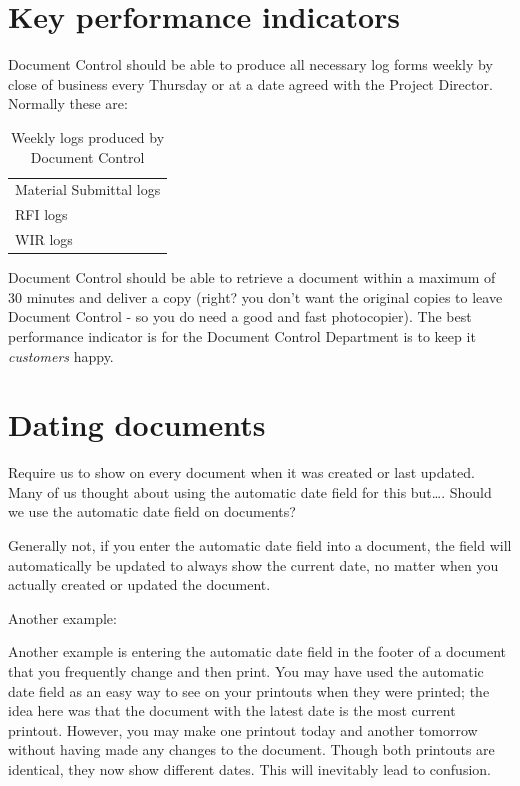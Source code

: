 \section*{Key performance indicators}

Document Control should be able to produce all necessary log forms weekly by close of business every Thursday or at a date agreed with the Project Director. Normally these are:

\begin{table}
\begin{tabular}{l}
\toprule
Material Submittal logs\\
RFI logs\\
WIR logs\\
\bottomrule
\end{tabular}
\caption{Weekly logs produced by Document Control}
\end{table}


Document Control should be able to retrieve a document within a maximum of 30 minutes and deliver a copy (right? you don't want the original copies to leave Document Control - so you do need a good and fast photocopier). The best performance indicator is for the Document Control Department is to keep it \textit{customers} happy. 

\section*{Dating documents}

Require us to show on every document when it was created or last updated. Many of us thought about using the automatic date field for this but….
Should we use the automatic date field on documents?

Generally not, if you enter the automatic date field into a document, the field will automatically be updated to always show the current date, no matter when you actually created or updated the document.



Another example:

Another example is entering the automatic date field in the footer of a document that you frequently change and then print. You may have used the automatic date field as an easy way to see on your printouts when they were printed; the idea here was that the document with the latest date is the most current printout. However, you may make one printout today and another tomorrow without having made any changes to the document. Though both printouts are identical, they now show different dates. This will inevitably lead to confusion. 

